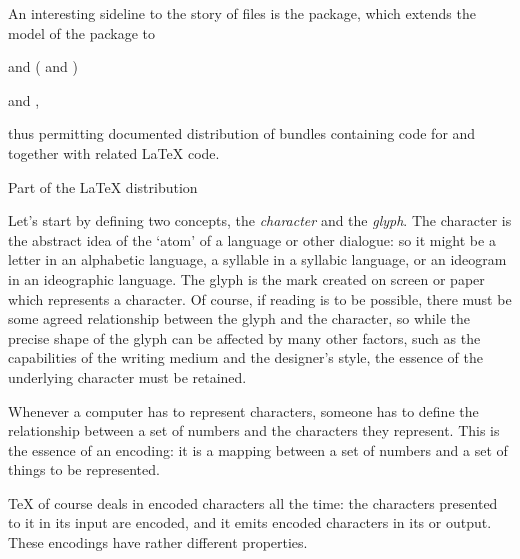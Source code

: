 An interesting sideline to the story of  files is the
 package, which extends the model of the 
package to
\begin{flatversion}
  \MF{} and \MP{} ( and )
\end{flatversion}
\begin{hyperversion}
   and ,
\end{hyperversion}
thus permitting documented distribution of bundles containing code for
\MF{} and \MP{} together with related \LaTeX{} code.
\begin{ctanrefs}
\item[AUC-TeX]
\item[clsguide.pdf]
\item[docmfp.sty]
\item[docstrip.tex]Part of the \LaTeX{} distribution
\item[DTX tutorial]
\item[dtxgen]
\item[makedtx]
\item[sty2dtx]
\end{ctanrefs}


Let's start by defining two concepts, the \emph{character} and the
\emph{glyph}.
The character is the abstract idea of the `atom' of a
language or other dialogue: so it might be a letter in an alphabetic
language, a syllable in a syllabic language, or an ideogram in an
ideographic language.  The glyph is the mark created on screen or
paper which represents a character.  Of
course, if reading is to be possible, there must be some agreed
relationship between the glyph and the character, so while the precise
shape of the glyph can be affected by many other factors, such as the
capabilities of the writing medium and the designer's style, the
essence of the underlying character must be retained.

Whenever a computer has to represent characters, someone has to define
the relationship between a set of numbers and the characters they
represent.  This is the essence of an encoding: it is a mapping
between a set of numbers and a set of things to be represented.

\TeX{} of course deals in encoded characters all the time: the
characters presented to it in its input are encoded, and it emits
encoded characters in its  or  output.  These
encodings have rather different properties.

